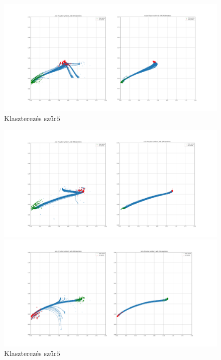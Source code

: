 \documentclass[acmtog, authorversion]{acmart}
\begin{document}
\begin{figure}
 \includegraphics[width=1\columnwidth]{clustering/n_cluster_5_before_after.png}

 \caption{Klaszterezés szűrő}

 \label{fig: Klaszterezés szűrő}   
\end{figure}

\begin{figure}
 \includegraphics[width=1\columnwidth]{clustering/n_cluster_7_before_after.png}

 \includegraphics[width=1\columnwidth]{clustering/n_cluster_8_before_after.png}

 \caption{Klaszterezés szűrő}

 \label{fig: Klaszterezés szűrő 2}   
\end{figure}
\end{document}
